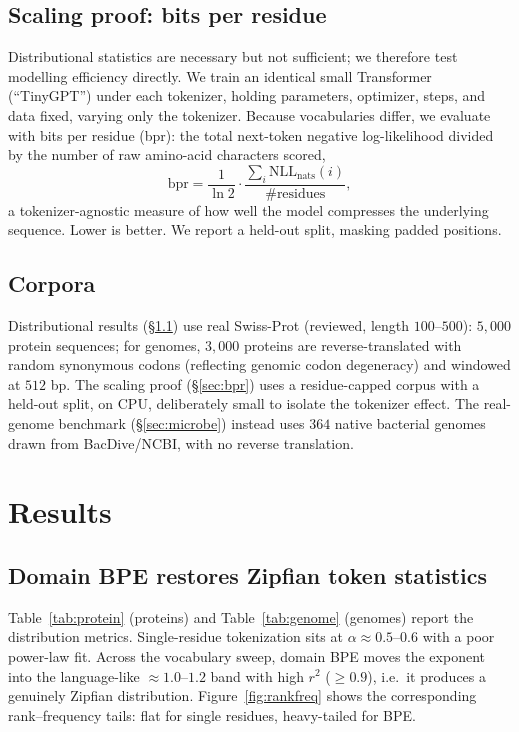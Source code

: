 \documentclass[11pt]{article}
\begin{document}
\subsection{Scaling proof: bits per residue}
\label{sec:methods-bpr}
Distributional statistics are necessary but not sufficient; we therefore test
modelling efficiency directly. We train an identical small Transformer
(``TinyGPT'') under each tokenizer, holding parameters, optimizer, steps, and
data fixed, varying only the tokenizer. Because vocabularies differ, we evaluate
with bits per residue (bpr): the total next-token negative log-likelihood
divided by the number of raw amino-acid characters scored,
\[
  \mathrm{bpr} = \frac{1}{\ln 2}\cdot
  \frac{\sum_i \mathrm{NLL}_\text{nats}(i)}{\#\text{residues}},
\]
a tokenizer-agnostic measure of how well the model compresses the underlying
sequence. Lower is better. We report a held-out split, masking padded positions.

\subsection{Corpora}
Distributional results (\S\ref{sec:zipf}) use real Swiss-Prot (reviewed, length
$100$--$500$): $5{,}000$ protein sequences; for genomes, $3{,}000$ proteins are
reverse-translated with random synonymous codons (reflecting genomic codon
degeneracy) and windowed at $512$ bp. The scaling proof (\S\ref{sec:bpr}) uses a
residue-capped corpus with a held-out split, on CPU, deliberately small to
isolate the tokenizer effect. The real-genome benchmark (\S\ref{sec:microbe})
instead uses $364$ native bacterial genomes drawn from BacDive/NCBI, with no
reverse translation.

\section{Results}
\subsection{Domain BPE restores Zipfian token statistics}
\label{sec:zipf}
Table~\ref{tab:protein} (proteins) and Table~\ref{tab:genome} (genomes) report
the distribution metrics. Single-residue tokenization sits at $\alpha \approx
0.5$--$0.6$ with a poor power-law fit. Across the vocabulary sweep, domain BPE
moves the exponent into the language-like $\approx 1.0$--$1.2$ band with high
$r^2$ ($\ge 0.9$), i.e.\ it produces a genuinely Zipfian distribution.
Figure~\ref{fig:rankfreq} shows the corresponding rank--frequency tails: flat
for single residues, heavy-tailed for BPE.
\end{document}
